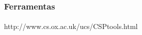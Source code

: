 \lipsum[1]
~\cite{Schneider:1999:CRT:555233}

\subsubsection{Ferramentas}
\paragraph{}
http://www.cs.ox.ac.uk/ucs/CSPtools.html
\lipsum[1]
